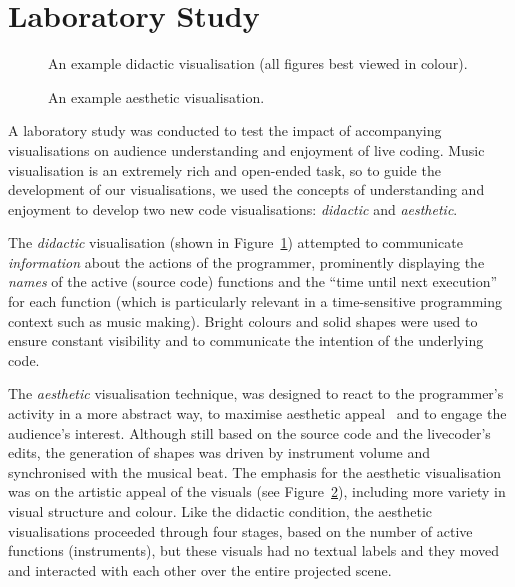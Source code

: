 \documentclass{sig-alternate}
\begin{document}
\section{Laboratory Study}

\begin{figure}
\centering
{}
\caption{An example didactic visualisation (all
  figures best viewed in colour).}
\label{fig:didactic-visualisation}
\end{figure}

\begin{figure}
\centering
{}
\caption{An example aesthetic visualisation.}
\label{fig:aesthetic-visualisation}
\end{figure}

A laboratory study was conducted to test the impact of accompanying
visualisations on audience understanding and enjoyment of live coding.
Music visualisation is an extremely rich and open-ended task, so to
guide the development of our visualisations, we used the concepts of
understanding and enjoyment to develop two new code visualisations:
\emph{didactic} and \emph{aesthetic}.

The \emph{didactic} visualisation (shown in
Figure~\ref{fig:didactic-visualisation}) attempted to communicate
\emph{information} about the actions of the programmer, prominently
displaying the \emph{names} of the active (source code) functions and
the ``time until next execution'' for each function (which is
particularly relevant in a time-sensitive programming context such as
music making). Bright colours and solid shapes were used to ensure
constant visibility and to communicate the intention of the underlying
code.

The \emph{aesthetic} visualisation technique, was designed to react to
the programmer's activity in a more abstract way, to maximise
aesthetic appeal~\cite{Cawthon2007} and to engage the audience's
interest. Although still based on the source code and the livecoder's
edits, the generation of shapes was driven by instrument volume and
synchronised with the musical beat. The emphasis for the aesthetic
visualisation was on the artistic appeal of the visuals (see
Figure~\ref{fig:aesthetic-visualisation}), including more variety in
visual structure and colour. Like the didactic condition, the
aesthetic visualisations proceeded through four stages, based on the
number of active functions (instruments), but these visuals had no
textual labels and they moved and interacted with each other over the
entire projected scene.
\end{document}

